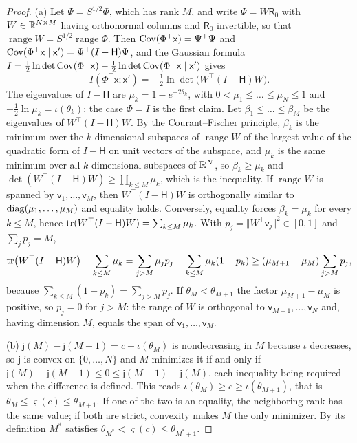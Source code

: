 \begin{proof}
(a) Let $\Psi=S^{1/2}\Phi$, which has rank $M$, and write $\Psi=W\mathsf R_0$ with $W\in\mathbb{R}^{N\times M}$ having orthonormal columns and $\mathsf R_0$ invertible, so that $\operatorname{range}W=S^{1/2}\operatorname{range}\Phi$. Then $\operatorname{Cov}(\Phi^\top\mathsf x)=\Psi^\top\Psi$ and $\operatorname{Cov}(\Phi^\top\mathsf x\mid\mathsf x')=\Psi^\top(I-\mathsf H)\Psi$, and the Gaussian formula $I=\frac12\ln\det\operatorname{Cov}(\Phi^\top\mathsf x)-\frac12\ln\det\operatorname{Cov}(\Phi^\top\mathsf x\mid\mathsf x')$ gives
\[
I(\Phi^\top\mathsf x;\mathsf x')=-\tfrac12\ln\det\bigl(W^\top(I-\mathsf H)W\bigr).
\]
The eigenvalues of $I-\mathsf H$ are $\mu_k=1-e^{-2\theta_k}$, with $0<\mu_1\le\dots\le\mu_N\le1$ and $-\frac12\ln\mu_k=\iota(\theta_k)$; the case $\Phi=I$ is the first claim. Let $\beta_1\le\dots\le\beta_M$ be the eigenvalues of $W^\top(I-\mathsf H)W$. By the Courant--Fischer principle, $\beta_k$ is the minimum over the $k$-dimensional subspaces of $\operatorname{range}W$ of the largest value of the quadratic form of $I-\mathsf H$ on unit vectors of the subspace, and $\mu_k$ is the same minimum over all $k$-dimensional subspaces of $\mathbb{R}^N$, so $\beta_k\ge\mu_k$ and $\det(W^\top(I-\mathsf H)W)\ge\prod_{k\le M}\mu_k$, which is the inequality. If $\operatorname{range}W$ is spanned by $\mathsf v_1,\dots,\mathsf v_M$, then $W^\top(I-\mathsf H)W$ is orthogonally similar to $\operatorname{diag}(\mu_1,\dots,\mu_M)$ and equality holds. Conversely, equality forces $\beta_k=\mu_k$ for every $k\le M$, hence $\operatorname{tr}(W^\top(I-\mathsf H)W)=\sum_{k\le M}\mu_k$. With $p_j=\Vert W^\top\mathsf v_j\Vert^2\in[0,1]$ and $\sum_jp_j=M$,
\[
\operatorname{tr}\bigl(W^\top(I-\mathsf H)W\bigr)-\sum_{k\le M}\mu_k=\sum_{j>M}\mu_jp_j-\sum_{k\le M}\mu_k(1-p_k)\ge(\mu_{M+1}-\mu_M)\sum_{j>M}p_j,
\]
because $\sum_{k\le M}(1-p_k)=\sum_{j>M}p_j$. If $\theta_M<\theta_{M+1}$ the factor $\mu_{M+1}-\mu_M$ is positive, so $p_j=0$ for $j>M$: the range of $W$ is orthogonal to $\mathsf v_{M+1},\dots,\mathsf v_N$ and, having dimension $M$, equals the span of $\mathsf v_1,\dots,\mathsf v_M$.

(b) $\mathsf j(M)-\mathsf j(M-1)=c-\iota(\theta_M)$ is nondecreasing in $M$ because $\iota$ decreases, so $\mathsf j$ is convex on $\{0,\dots,N\}$ and $M$ minimizes it if and only if $\mathsf j(M)-\mathsf j(M-1)\le0\le\mathsf j(M+1)-\mathsf j(M)$, each inequality being required when the difference is defined. This reads $\iota(\theta_M)\ge c\ge\iota(\theta_{M+1})$, that is $\theta_M\le\varsigma(c)\le\theta_{M+1}$. If one of the two is an equality, the neighboring rank has the same value; if both are strict, convexity makes $M$ the only minimizer. By its definition $M^\ast$ satisfies $\theta_{M^\ast}<\varsigma(c)\le\theta_{M^\ast+1}$.
\end{proof}

